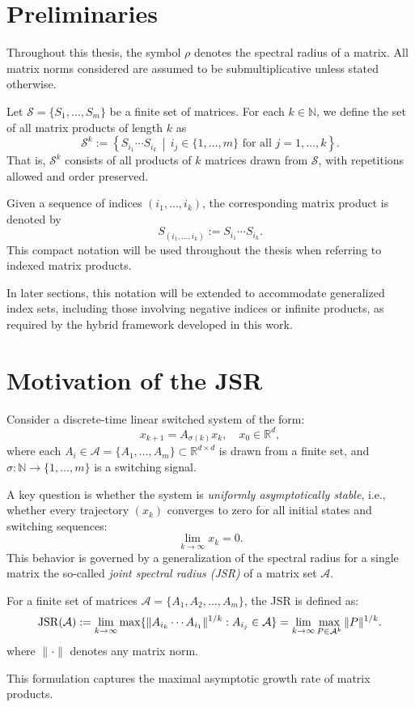 \section{Preliminaries}

Throughout this thesis, the symbol $\rho$ denotes the spectral radius of a matrix. All matrix norms considered are assumed to be submultiplicative unless stated otherwise.

Let $\mathcal{S} = \{S_1, \dots, S_m\}$ be a finite set of matrices. For each $k \in \mathbb{N}$, we define the set of all matrix products of length $k$ as
\[
\mathcal{S}^k := \left\{ S_{i_1} \cdots S_{i_k} \,\middle|\, i_j \in \{1, \dots, m\} \text{ for all } j = 1, \dots, k \right\}.
\]
That is, $\mathcal{S}^k$ consists of all products of $k$ matrices drawn from $\mathcal{S}$, with repetitions allowed and order preserved.

Given a sequence of indices $(i_1, \dots, i_k)$, the corresponding matrix product is denoted by
\[
S_{(i_1, \dots, i_k)} := S_{i_1} \cdots S_{i_k}.
\]
This compact notation will be used throughout the thesis when referring to indexed matrix products.

In later sections, this notation will be extended to accommodate generalized index sets, including those involving negative indices or infinite products, as required by the hybrid framework developed in this work.

\section{Motivation of the JSR}

Consider a discrete-time linear switched system of the form:
\begin{equation} \label{eq:switched_system}
x_{k+1} = A_{\sigma(k)} x_k, \quad x_0 \in \mathbb{R}^d,
\end{equation}
where each $A_i \in \mathcal{A} = \{A_1, \dots, A_m\} \subset \mathbb{R}^{d \times d}$ is drawn from a finite set, and $\sigma: \mathbb{N} \to \{1, \dots, m\}$ is a switching signal.

A key question is whether the system is \emph{uniformly asymptotically stable}, i.e., whether every trajectory $(x_k)$ converges to zero for all initial states and switching sequences:
\[
\lim_{k \to \infty} x_k = 0.
\]
This behavior is governed by a generalization of the spectral radius for a single matrix the so-called \emph{joint spectral radius (JSR)} of a matrix set $\mathcal{A}$.
\begin{definition}
    For a finite set of matrices $\mathcal{A} = \{A_1, A_2, \dots, A_m\}$, the JSR is defined as:
    \begin{equation} \label{eq:jsr_def}
        \operatorname{JSR}(\mathcal{A}) := \lim_{k \to \infty} \max \{ \|A_{i_k} \cdots A_{i_1}\|^{1/k} : A_{i_j} \in \mathcal{A} \} = \lim_{k \to \infty} \max_{P \in \mathcal{A}^k}  \|P\|^{1/k}.
    \end{equation}
    where $\|\cdot\|$ denotes any matrix norm.
\end{definition}
This formulation captures the maximal asymptotic growth rate of matrix products.


